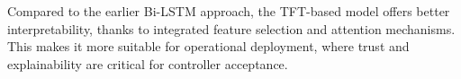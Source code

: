 Compared to the earlier \gls{Bi-LSTM} approach, the \gls{TFT}-based model offers better interpretability, thanks to integrated feature selection and attention mechanisms. 
This makes it more suitable for operational deployment, where trust and explainability are critical for controller acceptance.





